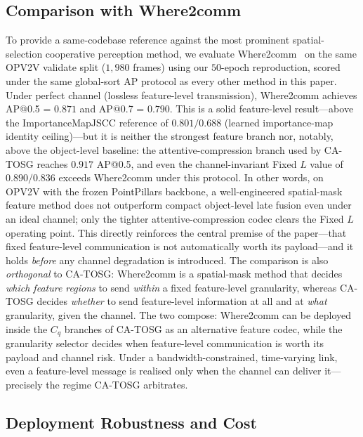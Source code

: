 \documentclass[journal]{IEEEtran}
\newcommand{\method}{CA-TOSG}
\begin{document}
\subsection{Comparison with Where2comm}\label{sec:where2comm}

To provide a same-codebase reference against the most prominent
spatial-selection cooperative perception method, we evaluate
Where2comm~\cite{hu2022where2comm} on the same OPV2V validate split
($1{,}980$ frames) using our $50$-epoch reproduction, scored under the
same global-sort AP protocol as every other method in this paper. Under
perfect channel (lossless feature-level transmission), Where2comm
achieves AP@0.5 = $0.871$ and AP@0.7 = $0.790$. This is a solid
feature-level result---above the ImportanceMapJSCC reference of
$0.801 / 0.688$ (learned importance-map identity ceiling)---but it is neither the strongest feature branch nor,
notably, above the object-level baseline: the attentive-compression
branch used by \method{} reaches $0.917$ AP@0.5, and even the
channel-invariant Fixed $L$ value of $0.890 / 0.836$ exceeds Where2comm
under this protocol. In other words, on OPV2V with the frozen
PointPillars backbone, a well-engineered spatial-mask feature method does
not outperform compact object-level late fusion even under an ideal
channel; only the tighter attentive-compression codec clears the Fixed
$L$ operating point. This directly reinforces the central premise of the
paper---that fixed feature-level communication is not automatically worth
its payload---and it holds \emph{before} any channel degradation is
introduced. The comparison is also \emph{orthogonal} to \method{}:
Where2comm is a spatial-mask method that decides \emph{which feature
regions} to send \emph{within} a fixed feature-level granularity, whereas
\method{} decides \emph{whether} to send feature-level information at all
and at \emph{what} granularity, given the channel. The two compose:
Where2comm can be deployed inside the $C_q$ branches of \method{} as an
alternative feature codec, while the granularity selector decides when
feature-level communication is worth its payload and channel risk. Under
a bandwidth-constrained, time-varying link, even a feature-level message
is realised only when the channel can deliver it---precisely the regime
\method{} arbitrates.

\subsection{Deployment Robustness and Cost}\label{sec:robustness}
\end{document}
